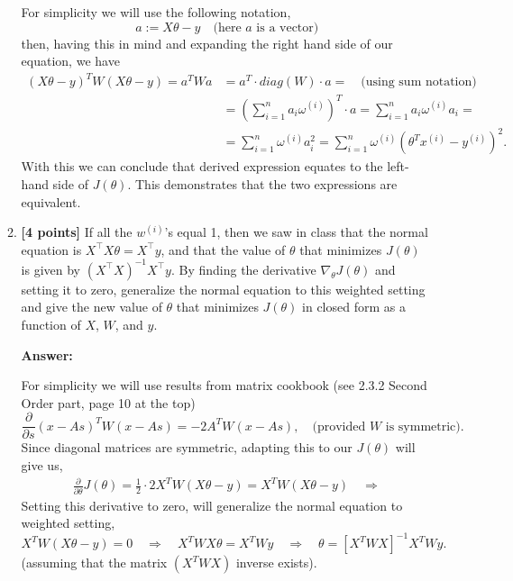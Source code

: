 \documentclass{article}
\begin{document}
\begin{enumerate}[label=\alph*)]
\begin{enumerate}[label=(\roman*.)]
For simplicity we will use the following notation,
\[a := X\theta - y \quad \mbox{(here $a$ is a vector)}\]
then, having this in mind and expanding the right hand side of our equation, we have
\begin{align*}
 (X\theta - y)^{T} W(X\theta - y) =a^TWa &=a^T \cdot diag(W) \cdot a=\quad\mbox{(using sum notation)}\\
&= \left(\sum\limits_{i=1}^n a_i\omega^{(i)} \right)^T \cdot a
= \sum\limits_{i=1}^n a_i \omega^{(i)} a_i =\\[10pt]
&= \sum\limits_{i=1}^n \omega^{(i)} a_i^2 = \boxed{\sum\limits_{i=1}^n \omega^{(i)}(\theta^Tx^{(i)} - y^{(i)})^2.}
\end{align*}
With this we can conclude that derived expression equates to the left-hand side of $J(\theta)$. This demonstrates that the two expressions are equivalent.





\item \textbf{[4 points]} If all the $w^{(i)}$'s equal 1, then we saw in class that the normal equation is $X^\top X \theta = X^\top y$, and that the value of $\theta$ that minimizes $J(\theta)$ is given by $(X^\top X)^{-1} X^\top y$. By finding the derivative $\nabla_\theta J(\theta)$ and setting it to zero, generalize the normal equation to this weighted setting and give the new value of $\theta$ that minimizes $J(\theta)$ in closed form as a function of $X$, $W$, and $y$.

\textbf{Answer:}

For simplicity we will use results from matrix cookbook (see 2.3.2 Second Order part, page 10 at the top)
\[
\frac{\partial}{\partial s}(x-As)^T W (x-As) = -2A^TW(x-As),\quad \mbox{(provided $W$ is symmetric).}
\]
Since diagonal matrices are symmetric, adapting this to our $J(\theta)$ will give us,
\begin{align*}
\frac{\partial}{\partial \theta}J(\theta) = \frac{1}{2}\cdot2X^TW(X\theta - y) = X^TW(X\theta - y)\quad\Rightarrow
\end{align*}
Setting this derivative to zero, will generalize the normal equation to
weighted setting,
\[
X^TW(X\theta - y) = 0 \quad\Rightarrow\quad X^TWX\theta = X^TWy\quad\Rightarrow\quad \boxed{\theta = \left[X^TWX\right]^{-1} X^TWy.}
\]
(assuming that the matrix $(X^T W X)$ inverse exists).








\end{enumerate}
\end{enumerate}
\end{document}
